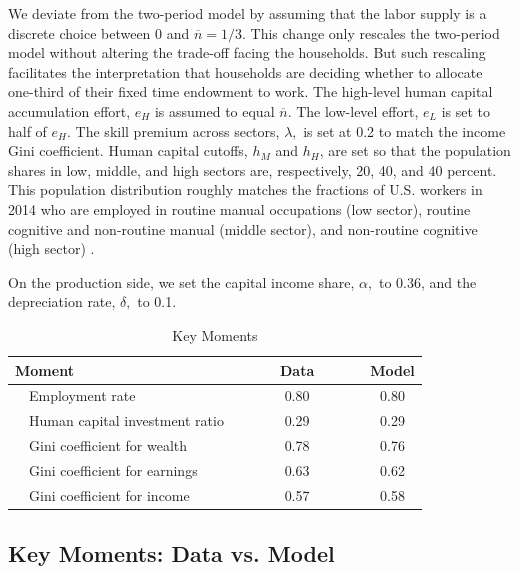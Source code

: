 \documentclass[12pt]{article}
\begin{document}
We deviate from the two-period model by assuming that the labor supply is a discrete choice between 0 and $\overline{n}=1/3$. This change only rescales the two-period model without altering the trade-off facing the households. But such rescaling facilitates the interpretation that households are deciding whether to allocate one-third of their fixed time endowment to work. The high-level human capital accumulation
effort, $e_{H}$ is assumed to equal $\overline{n}.$ The low-level
effort, $e_{L}$ is set to half of $e_{H}$. The skill premium across
sectors, $\lambda,$ is set at 0.2 to match the income Gini coefficient.
Human capital cutoffs, $h_{M}$ and $h_{H}$, are set so that the population shares in low, middle, and high sectors are, respectively, 20, 40, and 40 percent. This population distribution roughly matches the fractions of U.S. workers in 2014 who are employed in routine manual occupations (low sector), routine cognitive and non-routine manual (middle sector), and non-routine cognitive (high sector) \cite{cortes_disappearing_2017}.


On the production side, we set the capital income share, $\alpha,$ to 0.36, and the depreciation rate, $\delta,$ to 0.1.

\begin{table}
\caption{\protect\label{tbl:moments}Key Moments}

\begin{centering}
\begin{tabular}{lccccrrrc}
\hline 
Moment  &  &  &  & Data  &  &  &  & Model\tabularnewline
\hline 
~~Employment rate  &  &  &  & 0.80  &  &  &  & 0.80\tabularnewline
~~Human capital investment ratio  &  &  &  & 0.29  &  &  &  & 0.29\tabularnewline
~~Gini coefficient for wealth  &  &  &  & 0.78  &  &  &  & 0.76\tabularnewline
~~Gini coefficient for earnings  &  &  &  & 0.63  &  &  &  & 0.62\tabularnewline
~~Gini coefficient for income  &  &  &  & 0.57  &  &  &  & 0.58\tabularnewline
\hline 
\end{tabular}
\par\end{centering}
\end{table}


\subsection{Key Moments: Data vs. Model}
\end{document}
